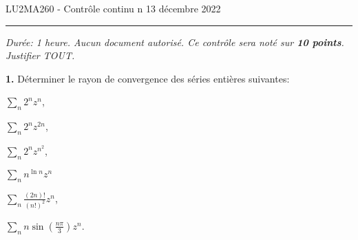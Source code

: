 \documentclass[a4paper,10pt]{article}
\begin{document}
\noindent LU2MA260 - Contrôle continu n
\hfill 13 décembre 2022
\medskip\hrule
\vspace{.3in}

\emph{Durée: 1 heure. Aucun document autorisé.
Ce contrôle sera noté sur \textbf{10 points}. Justifier TOUT.}


\vspace{.1in}
\noindent
\textbf{1.}
Déterminer le rayon de convergence des séries entières suivantes:
\begin{enumerate}[label=\alph*)]
\begin{minipage}{0.4\linewidth}
    \item $\sum_n 2^nz^n$,
    \item $\sum_n 2^nz^{2n}$,
    \item $\sum_n 2^nz^{n^2}$,
\end{minipage}
\begin{minipage}{0.4\linewidth}
    \item $\sum_n n^{\ln n}z^n$
    \item $\sum_n \frac{(2n)!}{(n!)^2}z^n$,
    \item $\sum_n n\sin(\frac{n\pi}{3})z^n$.
\end{minipage}
\end{enumerate}
\end{document}
